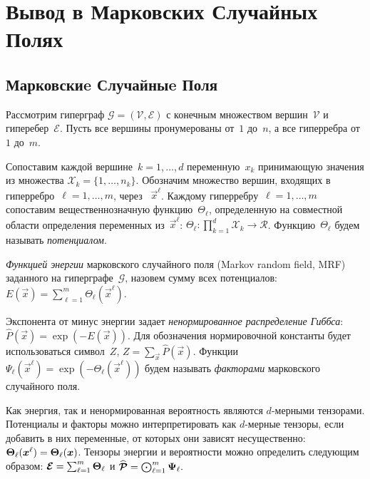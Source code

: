 \chapter{Вывод в Марковских Случайных Полях} \label{chap:mrf}
\section{Марковскиe Случайныe Поля} \label{sec:mrf}

Рассмотрим гиперграф $\mathcal{G} = (\mathcal{V}, \mathcal{E})$ с конечным множеством вершин~$\mathcal{V}$ и гиперебер~$\mathcal{E}$.
Пусть все вершины пронумерованы от~$1$ до~$n$, а все гиперребра от~$1$ до~$m$.

Сопоставим каждой вершине~$k = 1,\ldots,d$ переменную~$x_k$ принимающую значения из множества $\mathcal{X}_k = \{1,\dots,n_k\}$.
Обозначим множество вершин, входящих в гиперребро~$\ell = 1, \ldots, m$, через ~$\vec{x}^\ell$.
Каждому гиперребру~$\ell = 1, \ldots, m$ сопоставим вещественнозначную функцию~$\Theta_\ell$, определенную на совместной области определения переменных из~$\vec{x}^\ell$: $\Theta_\ell: \prod_{k=1}^d \mathcal{X}_k \to \mathcal{R}$. Функцию~$\Theta_\ell$ будем называть \emph{потенциалом}.

\emph{Функцией энергии} марковского случайного поля (Markov random field, MRF) заданного на гиперграфе~$\mathcal{G}$, назовем сумму всех потенциалов:
$
E(\vec{x}) = \sum_{\ell = 1}^{m} \Theta_\ell(\vec{x}^{\ell}).
$

Экспонента от минус энергии задает \emph{ненормированное распределение Гиббса}:
$
\widehat{P}(\vec{x}) = \exp(-E(\vec{x})).
$
Для обозначения нормировочной константы будет использоваться символ~$Z$, $Z = \sum_{\vec{x}} \widehat{P}(\vec{x})$. Функции $\Psi_\ell(\vec{x}^\ell) = \exp(-\Theta_\ell(\vec{x}^{\ell}))$ будем называть \emph{факторами} марковского случайного поля.

Как энергия, так и ненормированная вероятность являются $d$-мерными тензорами. Потенциалы и факторы можно интерпретировать как $d$-мерные тензоры, если добавить в них переменные, от которых они зависят несущественно: $\boldsymbol{\Theta}_\ell (\boldsymbol{x}^\ell) = \boldsymbol{\Theta}_\ell (\boldsymbol{x})$. Тензоры энергии и вероятности можно определить следующим образом:
$
\boldsymbol{\mathcal{E}} = \sum_{\ell = 1}^m \boldsymbol{\Theta}_\ell
$
и
$
\widehat{\boldsymbol{\mathcal{P}}} =   \bigodot_{\ell = 1}^m \boldsymbol{\Psi}_\ell.
$

